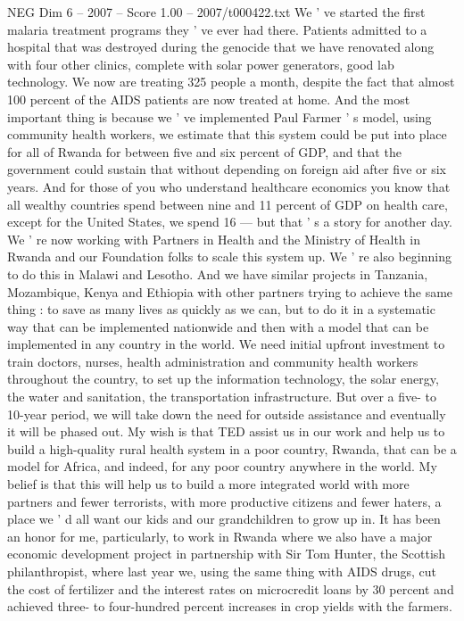 \begin{textsample}{NEG Dim 6 – 2007 – Score 1.00 – 2007/t000422.txt}
We ' ve started the first malaria treatment programs they ' ve ever had there.
Patients admitted to a hospital that was destroyed during the genocide that we have renovated along with four other clinics, complete with solar power generators, good lab technology.
We now are treating 325 people a month, despite the fact that almost 100 percent of the AIDS patients are now treated at home.
And the most important thing is because we ' ve implemented Paul Farmer ' s model, using community health workers, we estimate that this system could be put into place for all of Rwanda for between five and six percent of GDP, and that the government could sustain that without depending on foreign aid after five or six years.
And for those of you who understand healthcare economics you know that all wealthy countries spend between nine and 11 percent of GDP on health care, except for the United States, we spend 16 — but that ' s a story for another day.
We ' re now working with Partners in Health and the Ministry of Health in Rwanda and our Foundation folks to scale this system up.
We ' re also beginning to do this in Malawi and Lesotho.
And we have similar projects in Tanzania, Mozambique, Kenya and Ethiopia with other partners trying to achieve the same thing : to save as many lives as quickly as we can, but to do it in a systematic way that can be implemented nationwide and then with a model that can be implemented in any country in the world.
We need initial upfront investment to train doctors, nurses, health administration and community health workers throughout the country, to set up the information technology, the solar energy, the water and sanitation, the transportation infrastructure.
But over a five- to 10-year period, we will take down the need for outside assistance and eventually it will be phased out.
My wish is that TED assist us in our work and help us to build a high-quality rural health system in a poor country, Rwanda, that can be a model for Africa, and indeed, for any poor country anywhere in the world.
My belief is that this will help us to build a more integrated world with more partners and fewer terrorists, with more productive citizens and fewer haters, a place we ' d all want our kids and our grandchildren to grow up in.
It has been an honor for me, particularly, to work in Rwanda where we also have a major economic development project in partnership with Sir Tom Hunter, the Scottish philanthropist, where last year we, using the same thing with AIDS drugs, cut the cost of fertilizer and the interest rates on microcredit loans by 30 percent and achieved three- to four-hundred percent increases in crop yields with the farmers.

\end{textsample}
